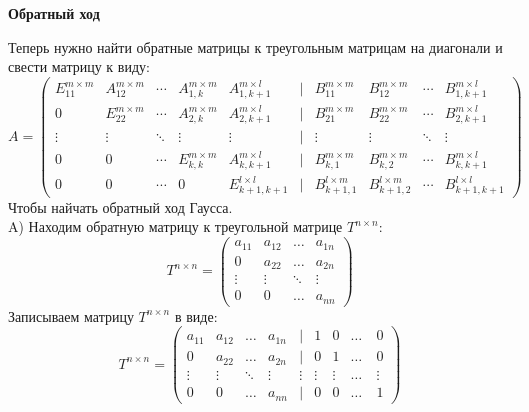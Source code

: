 \documentclass[a4paper,12pt]{article}
\begin{document}
\begin{center}
{\bfseries Обратный ход}
\end{center}

Теперь нужно найти обратные матрицы к треугольным матрицам на диагонали и свести матрицу к виду:
\begin{equation}
A=
  \begin{pmatrix} 
    E_{11}^{m \times m} & A_{12}^{m \times m} & \cdots & A_{1,k}^{m \times m} & A_{1,k+1}^{m \times l} & | & B_{11}^{m \times m} &  B_{12}^{m \times m} & \cdots & B_{1,k+1}^{m \times l}\\
    0 & E_{22}^{m \times m} & \cdots & A_{2,k}^{m \times m} & A_{2,k+1}^{m \times l} & | & B_{21}^{m \times m} &  B_{22}^{m \times m} & \cdots & B_{2,k+1}^{m \times l}\\
    \vdots & \vdots & \ddots & \vdots & \vdots & | & \vdots & \vdots & \ddots & \vdots\\ 
    0 & 0 & \cdots & E_{k,k}^{m \times m} & A_{k,k+1}^{m \times l} & | & B_{k,1}^{m \times m} &  B_{k,2}^{m \times m} & \cdots & B_{k,k+1}^{m \times l}\\
    0 & 0 & \cdots & 0 & E_{k+1,k+1}^{l \times l} & | & B_{k+1,1}^{l \times m} &  B_{k+1,2}^{l \times m} & \cdots & B_{k+1,k+1}^{l \times l} 
  \end{pmatrix}
\end{equation}
Чтобы найчать обратный ход Гаусса.\\
A) Находим обратную матрицу к треугольной матрице $T^{n\times n}$: 
$$T^{n\times n}=
   \begin{pmatrix}
     a_{11}& a_{12} &\ldots & a_{1n}\\
     0& a_{22} &\ldots & a_{2n}\\
     \vdots& \vdots &\ddots & \vdots\\
     0& 0 &\ldots & a_{nn}
    \end{pmatrix}
$$ 
Записываем матрицу $T^{n\times n}$ в виде:
$$T^{n\times n}=
   \begin{pmatrix}
     a_{11}& a_{12} &\ldots & a_{1n} & | & 1 & 0 & \ldots \ & 0\\
     0& a_{22} &\ldots & a_{2n} & | & 0 & 1 & \ldots \ & 0\\
     \vdots& \vdots &\ddots & \vdots &\vdots& \vdots &\vdots & \ldots & \vdots \\
     0& 0 &\ldots & a_{nn} & | & 0 & 0 & \ldots \ & 1
    \end{pmatrix}
$$ 
\end{document}
